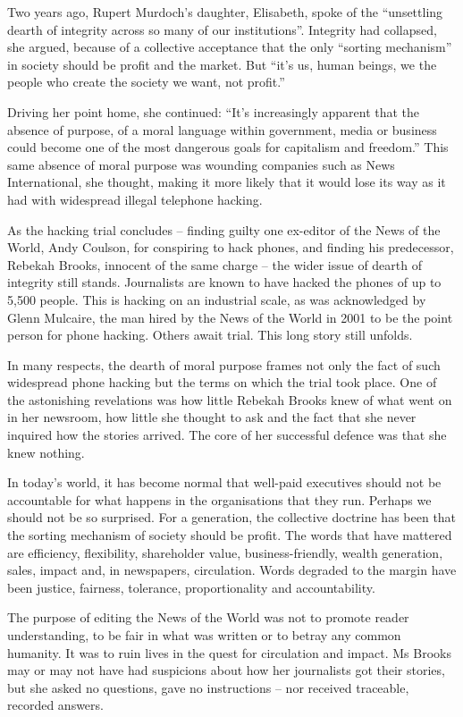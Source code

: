 Two years ago, Rupert Murdoch's daughter, Elisabeth, spoke of the ``unsettling dearth of integrity across so many of our institutions''. Integrity had collapsed, she argued, because of a collective acceptance that the only ``sorting mechanism'' in society should be profit and the market. But ``it's us, human beings, we the people who create the society we want, not profit.''


Driving her point home, she continued: ``It's increasingly apparent that the absence of purpose, of a moral language within government, media or business could become one of the most dangerous goals for capitalism and freedom.'' This same absence of moral purpose was wounding companies such as News International, she thought, making it more likely that it would lose its way as it had with widespread illegal telephone hacking.


As the hacking trial concludes – finding guilty one ex-editor of the News of the World, Andy Coulson, for conspiring to hack phones, and finding his predecessor, Rebekah Brooks, innocent of the same charge – the wider issue of dearth of integrity still stands. Journalists are known to have hacked the phones of up to 5,500 people. This is hacking on an industrial scale, as was acknowledged   by Glenn Mulcaire, the man hired by the News of the World in 2001 to be the point person for phone hacking. Others await trial. This long story still unfolds.


In many respects, the dearth of moral purpose frames not only the fact of such widespread phone hacking but the terms on which the trial took place. One of the astonishing revelations was how little Rebekah Brooks knew of what went on in her newsroom, how little she thought to ask and the fact that she never inquired how the stories arrived. The core of her successful defence was that she knew nothing.


In today's world, it has become normal that well-paid executives should not be accountable for what happens in the organisations that they run. Perhaps we should not be so surprised. For a generation, the collective doctrine has been that the sorting mechanism of society should be profit. The words that have mattered  are efficiency, flexibility, shareholder value, business-friendly, wealth generation, sales, impact and, in newspapers, circulation. Words degraded to the margin have been justice, fairness, tolerance, proportionality and accountability.


The purpose of editing the News of the World was not to promote reader understanding, to be fair in what was written or to betray any common humanity.  It was to ruin lives in the quest for circulation and impact. Ms Brooks may or may not have had suspicions about how her journalists got their stories, but she asked  no questions, gave no instructions – nor received traceable, recorded answers.